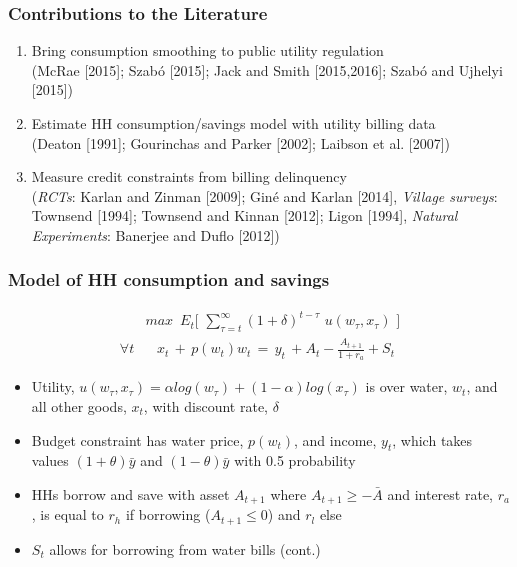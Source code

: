\documentclass[aspectratio=149]{beamer}
\begin{document}
\begin{frame}
\frametitle{Contributions to the Literature}

\begin{enumerate}
\item Bring consumption smoothing to public utility regulation \\
{\footnotesize (McRae [2015]; Szab\'o [2015]; Jack and Smith [2015,2016]; Szab\'o and Ujhelyi [2015])}
\vspace{2mm}

\item Estimate HH consumption/savings model with utility billing data \\
{\footnotesize (Deaton [1991]; Gourinchas and Parker [2002]; Laibson et al. [2007])}
\vspace{2mm}

\item Measure credit constraints from billing delinquency \\
{ \footnotesize (\textit{RCTs}: Karlan and Zinman [2009]; Gin\'e and Karlan [2014],  \textit{Village surveys}: Townsend [1994]; Townsend and Kinnan [2012]; Ligon [1994], \textit{Natural Experiments}: Banerjee and Duflo [2012]) }

\end{enumerate}

\end{frame}




\begin{frame}
\frametitle{Model of HH consumption and savings}

\begin{align*}\label{eq:u}
&max \, \, \, E_t \Big[ \, \, \sum_{\tau = t}^{\infty} (1+\delta)^{t-\tau} \,\, u(w_{\tau},x_{\tau}) \, \, \Big] \\
\forall t &\,\,\,\,\,x_t \, + \, p(w_t) w_t \, = \, y_t \, + A_t - \frac{ A_{t+1} }{1+r_a} + S_t
\end{align*}

\begin{itemize}
\item Utility, $u(w_{\tau},x_{\tau}) =\alpha log( w_{\tau}) + (1-\alpha) log(x_{\tau})$ is over water, $w_t$, and all other goods, $x_t$, with discount rate, $\delta$
\vspace{.5mm}
\item Budget constraint has water price, $p(w_t)$, and income, $y_t$, which takes values $(1+\theta)\bar{y}$ and $(1-\theta)\bar{y}$ with 0.5 probability
\vspace{.5mm}
\item HHs borrow and save with asset $A_{t+1}$ where $A_{t+1}\geq -\bar{A}$ and interest rate, $r_a$, is  equal to $r_h$ if borrowing ($A_{t+1}\leq 0$) and $r_l$ else
\vspace{.5mm}
\item $S_t$ allows for borrowing from water bills (cont.)
\end{itemize}

\end{frame}
\end{document}

